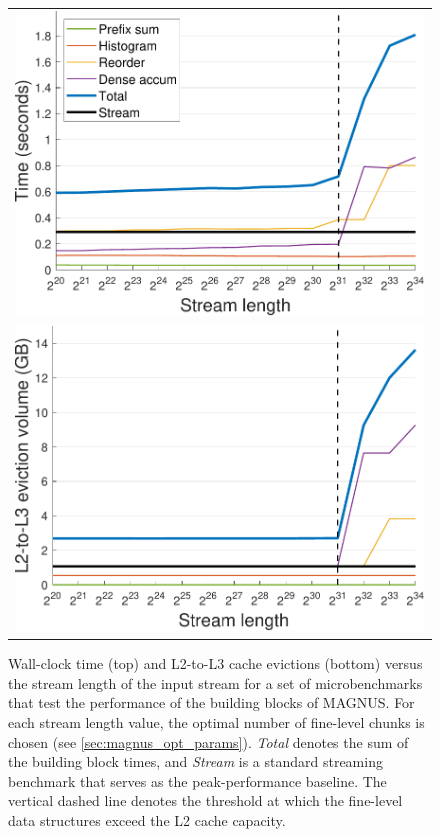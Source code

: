 \begin{figure}[t]
\centering
\begin{tabular}{c}
\includegraphics[width=\figwidth]{figs/spr_buildingBlocks_varyMaxIdx_time.pdf} \\
\includegraphics[width=\figwidth]{figs/spr_buildingBlocks_varyMaxIdx_L3Evict.pdf}
\end{tabular}
\caption{Wall-clock time (top) and L2-to-L3 cache evictions (bottom) versus the stream length of the input stream for a set of microbenchmarks that test the performance of the building blocks of MAGNUS.  For each stream length value, the optimal number of fine-level chunks is chosen (see \autoref{sec:magnus_opt_params}). \textit{Total} denotes the sum of the building block times, and \textit{Stream} is a standard streaming benchmark that serves as the peak-performance baseline.
The vertical dashed line denotes the threshold at which the fine-level data structures exceed the L2 cache capacity.}
\label{fig:building_blocks_varyMaxIdx}
\end{figure}

